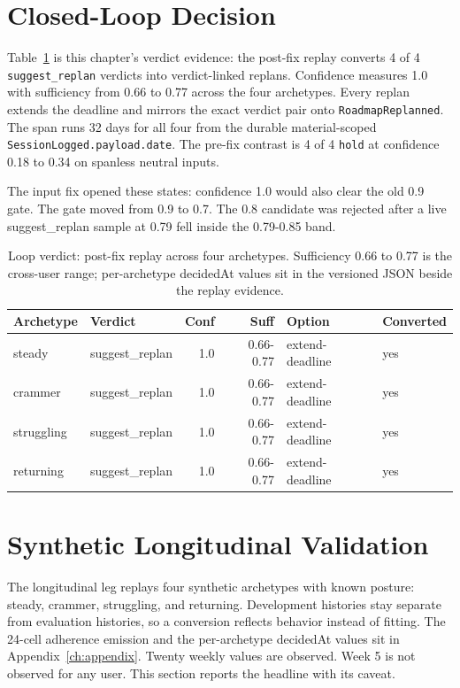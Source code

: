 \section{Closed-Loop Decision}
Table~\ref{tab:res-verdict} is this chapter's verdict evidence: the post-fix replay converts 4 of 4 \texttt{suggest\_replan} verdicts into verdict-linked replans. Confidence measures 1.0 with sufficiency from 0.66 to 0.77 across the four archetypes. Every replan extends the deadline and mirrors the exact verdict pair onto \texttt{RoadmapReplanned}. The span runs 32 days for all four from the durable material-scoped \texttt{SessionLogged.payload.date}. The pre-fix contrast is 4 of 4 \texttt{hold} at confidence 0.18 to 0.34 on spanless neutral inputs.

The input fix opened these states: confidence 1.0 would also clear the old 0.9 gate. The gate moved from 0.9 to 0.7. The 0.8 candidate was rejected after a live suggest\_replan sample at 0.79 fell inside the 0.79-0.85 band.

\begin{table}[htbp]
\centering
\footnotesize
\caption{Loop verdict: post-fix replay across four archetypes. Sufficiency 0.66 to 0.77 is the cross-user range; per-archetype decidedAt values sit in the versioned JSON beside the replay evidence.}
\label{tab:res-verdict}
\begin{tabular}{l l r r l l}
\toprule
\textbf{Archetype} & \textbf{Verdict} & \textbf{Conf} & \textbf{Suff} & \textbf{Option} & \textbf{Converted} \\
\midrule
steady & suggest\_replan & 1.0 & 0.66-0.77 & extend-deadline & yes \\
crammer & suggest\_replan & 1.0 & 0.66-0.77 & extend-deadline & yes \\
struggling & suggest\_replan & 1.0 & 0.66-0.77 & extend-deadline & yes \\
returning & suggest\_replan & 1.0 & 0.66-0.77 & extend-deadline & yes \\
\bottomrule
\end{tabular}
\end{table}

\section{Synthetic Longitudinal Validation}
The longitudinal leg replays four synthetic archetypes with known posture: steady, crammer, struggling, and returning. Development histories stay separate from evaluation histories, so a conversion reflects behavior instead of fitting. The 24-cell adherence emission and the per-archetype decidedAt values sit in Appendix~\ref{ch:appendix}. Twenty weekly values are observed. Week 5 is not observed for any user. This section reports the headline with its caveat.

